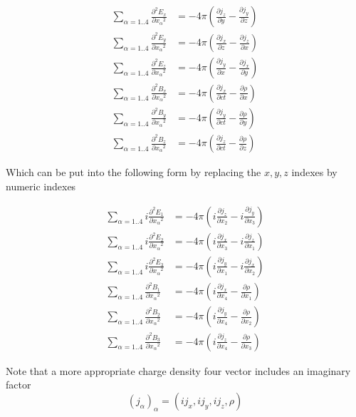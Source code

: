 \documentclass{article}      %
\newcommand{\grad}[0]{\boldsymbol{\nabla}}
\newcommand{\curl}[0]{\grad \times}
\newcommand{\D}[2] {\frac {\partial #2} {\partial #1}}
\newcommand{\Dsq}[2] {\frac {\partial^2 #2} {\partial {#1}^2}}
\newcommand{\Bj}[0]{\mathbf{j}}
\begin{document}


\begin{align*}
\sum_{\alpha = 1 .. 4}{\Dsq{x_\alpha}{E_x}} &= - 4\pi (\D{y}{j_z} - \D{z}{j_y}) \\
\sum_{\alpha = 1 .. 4}{\Dsq{x_\alpha}{E_y}} &= - 4\pi (\D{z}{j_x} - \D{x}{j_z}) \\
\sum_{\alpha = 1 .. 4}{\Dsq{x_\alpha}{E_z}} &= - 4\pi (\D{x}{j_y} - \D{y}{j_x}) \\
\sum_{\alpha = 1 .. 4}{\Dsq{x_\alpha}{B_x}} &= - 4\pi (\D{ct}{j_x} - \D{x}{\rho})\\
\sum_{\alpha = 1 .. 4}{\Dsq{x_\alpha}{B_y}} &= - 4\pi (\D{ct}{j_y} - \D{y}{\rho})\\
\sum_{\alpha = 1 .. 4}{\Dsq{x_\alpha}{B_z}} &= - 4\pi (\D{ct}{j_z} - \D{z}{\rho})
\end{align*}

Which can be put into the following form by replacing the $x, y, z$ indexes by numeric indexes

\begin{align*}
\sum_{\alpha = 1 .. 4}{i \Dsq{x_\alpha}{E_1}} &= - 4\pi (i \D{x_2}{j_z} - i \D{x_3}{j_y}) \\
\sum_{\alpha = 1 .. 4}{i \Dsq{x_\alpha}{E_2}} &= - 4\pi (i \D{x_3}{j_x} - i \D{x_1}{j_z}) \\
\sum_{\alpha = 1 .. 4}{i \Dsq{x_\alpha}{E_3}} &= - 4\pi (i \D{x_1}{j_y} - i \D{x_2}{j_x}) \\
\sum_{\alpha = 1 .. 4}{\Dsq{x_\alpha}{B_1}} &= - 4\pi (i \D{x_4}{j_x} - \D{x_1}{\rho})\\
\sum_{\alpha = 1 .. 4}{\Dsq{x_\alpha}{B_2}} &= - 4\pi (i \D{x_4}{j_y} - \D{x_2}{\rho})\\
\sum_{\alpha = 1 .. 4}{\Dsq{x_\alpha}{B_3}} &= - 4\pi (i \D{x_4}{j_z} - \D{x_3}{\rho})
\end{align*}

Note that a more appropriate charge density four vector includes an imaginary factor
\begin{equation*}
(j_\alpha)_\alpha = (i j_x, i j_y, i j_z, \rho)
\end{equation*}
\end{document}
